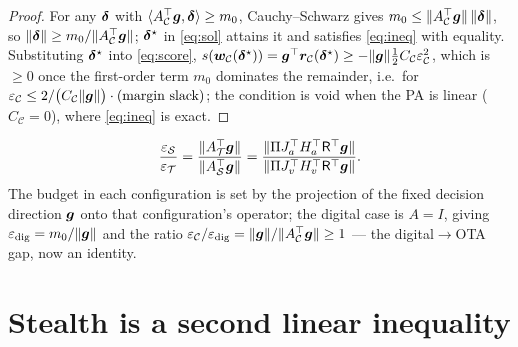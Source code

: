 \documentclass[11pt]{article}
\newcommand{\norm}[1]{\lVert #1\rVert}\newcommand{\Rx}{\mathsf{R}}
\begin{document}
\begin{proof}
For any $\bm\delta$ with $\langle A_{\mathcal C}^\top\bm g,\bm\delta\rangle\ge m_0$, Cauchy--Schwarz gives
$m_0\le\norm{A_{\mathcal C}^\top\bg}\,\norm{\bd}$, so $\norm{\bd}\ge m_0/\norm{A_{\mathcal C}^\top\bg}$;
$\bm\delta^\star$ in \eqref{eq:sol} attains it and satisfies \eqref{eq:ineq} with equality. Substituting
$\bm\delta^\star$ into \eqref{eq:score}, $s(\bw_{\mathcal C}(\bd^\star))=\bg^\top\bm r_{\mathcal C}(\bd^\star)
\ge-\norm{\bg}\tfrac12 C_{\mathcal C}\varepsilon_{\mathcal C}^2$, which is $\ge0$ once the first-order
term $m_0$ dominates the remainder, i.e.\ for
$\varepsilon_{\mathcal C}\le 2/\big(C_{\mathcal C}\norm{\bg}\big)\cdot(\text{margin slack})$; the
condition is void when the PA is linear ($C_{\mathcal C}=0$), where \eqref{eq:ineq} is exact.
\end{proof}

\begin{corollary}\label{cor:ratio}
\[
  \frac{\varepsilon_{\mathcal S}}{\varepsilon_{\mathcal T}}
  =\frac{\norm{A_{\mathcal T}^\top\bg}}{\norm{A_{\mathcal S}^\top\bg}}
  =\frac{\norm{\Pi J_a^\top H_a^\top \Rx^\top \bg}}{\norm{\Pi J_v^\top H_v^\top \Rx^\top \bg}} .
\]
The budget in each configuration is set by the projection of the fixed decision direction $\bm g$
onto that configuration's operator; the digital case is $A=I$, giving
$\varepsilon_{\mathrm{dig}}=m_0/\norm{\bg}$ and the ratio
$\varepsilon_{\mathcal C}/\varepsilon_{\mathrm{dig}}=\norm{\bg}/\norm{A_{\mathcal C}^\top\bg}\ge1$
--- the digital$\to$OTA gap, now an identity.
\end{corollary}

\section{Stealth is a second linear inequality}
\end{document}
